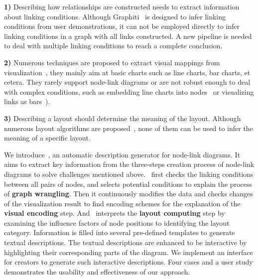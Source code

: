 \noindent \textbf{1)} 
Describing how relationships are constructed needs to extract information about linking conditions.
Although Graphiti~\cite{DBLP:journals/tvcg/SrinivasanPEB18} is designed to infer linking conditions from user demonstrations, it can not be employed directly to infer linking conditions in a graph with all links constructed.
A new pipeline is needed to deal with multiple linking conditions to reach a complete conclusion.

\noindent \textbf{2)} %
Numerous techniques are proposed to extract visual mappings from visualization~\cite{DBLP:conf/uist/HarperA14, DBLP:journals/tvcg/HoqueA20, DBLP:journals/corr/abs-2103-00741},  they mainly aim at basic charts such as line charts, bar charts, et cetera.
They rarely support node-link diagrams or are not robust enough to deal with complex conditions, such as embedding line charts into nodes~\cite{DBLP:journals/bmcbi/JunkerKS06} or visualizing links as bars~\cite{DBLP:conf/iv/SchoffelSE16}).

\noindent \textbf{3)} Describing a layout should determine the meaning of the layout.
Although numerous layout algorithms are proposed~\cite{hachul2004drawing, DBLP:journals/spe/FruchtermanR91, DBLP:conf/gd/GansnerKN04, DBLP:conf/gd/BrandesP06, DBLP:journals/tvcg/ZhuCHHLZ21}, none of them can be used to infer the meaning of a specific layout.

We introduce~\textit{\ApproachName}, an automatic description generator for node-link diagrams.
It aims to extract key information from the three-steps creation process of node-link diagrams to solve challenges mentioned above.
\ApproachName~first checks the linking conditions between all pairs of nodes, and selects potential conditions to explain the process of \textbf{graph wrangling}.
Then it continuously modifies the data and checks changes of the visualization result to find encoding schemes for the explanation of the \textbf{visual encoding} step.
And \ApproachName~interprets the \textbf{layout computing} step by examining the influence factors of node positions to identifying the layout category.
Information is filled into several pre-defined templates to generate textual descriptions.
The textual descriptions are enhanced to be interactive by highlighting their corresponding parts of the diagram.
We implement an interface for creators to generate such interactive descriptions.
Four cases and a user study demonstrates the usability and effectiveness of our approach.